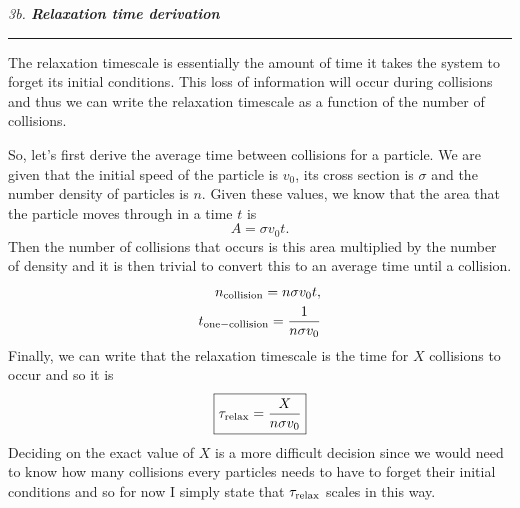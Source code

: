 \documentclass[12pt, letterpaper, twoside]{article}
\newcommand{\question}[1]{{\noindent \it #1}}
\newcommand{\answer}[1]{
    \par\noindent\rule{\textwidth}{0.4pt}#1\vspace{0.5cm}
}
\begin{document}
\question{3b. \textbf{Relaxation time derivation}}
\answer{
    The relaxation timescale is essentially the amount of time it takes the system to forget its initial conditions. This loss of information will occur during collisions and thus we can write the relaxation timescale as a function of the number of collisions.
    
    So, let's first derive the average time between collisions for a particle. We are given that the initial speed of the particle is $v_0$, its cross section is $\sigma$ and the number density of particles is $n$. Given these values, we know that the area that the particle moves through in a time $t$ is
    \begin{equation}
        A = \sigma v_0 t.
    \end{equation}
    Then the number of collisions that occurs is this area multiplied by the number of density and it is then trivial to convert this to an average time until a collision.
    \begin{align}
        n_{\rm collision} = n \sigma v_0 t,\\
        t_{\rm one-collision} = \frac{1}{n \sigma v_0}
    \end{align}
    Finally, we can write that the relaxation timescale is the time for $X$ collisions to occur and so it is
    \begin{equation}\label{eq:t_relax}
        \boxed{ \tau_{\rm relax} = \frac{X}{n \sigma v_0} }
    \end{equation}
    Deciding on the exact value of $X$ is a more difficult decision since we would need to know how many collisions every particles needs to have to forget their initial conditions and so for now I simply state that $\tau_{\rm relax}$ scales in this way.
}
\end{document}
